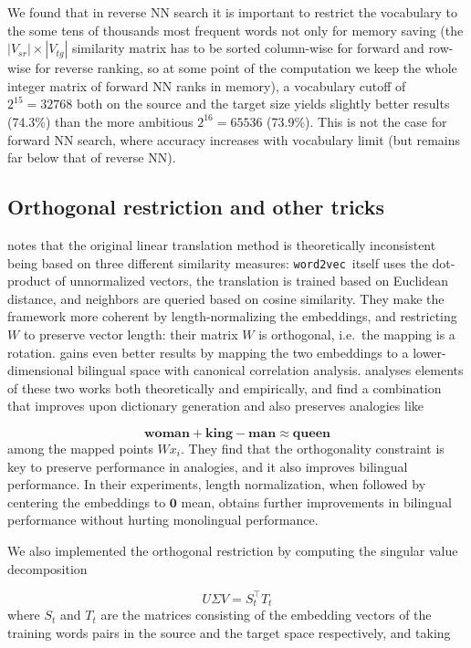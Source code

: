 \documentclass[11pt]{article}
\begin{document}
We found that in reverse NN search it is important to restrict the vocabulary to
the some tens of thousands most frequent words not only for memory saving (the
$|V_{sr}|\times|V_{tg}|$ similarity matrix has to be sorted column-wise for
forward and row-wise for reverse ranking, so at some point of the computation
we keep the whole integer matrix of forward NN ranks in memory), a vocabulary
cutoff of $2^{15}=32768$ both on the source and the target size yields slightly
better results (74.3\%) than the more ambitious $2^{16}=65536$ (73.9\%). This
is not the case for forward NN search, where accuracy increases with vocabulary
limit (but remains far below that of reverse NN).

\subsection{Orthogonal restriction and other tricks}

\newcommand{\wordtovec}{\texttt{word2vec}}

\cite{Xing:2015} notes that the original linear translation method is
theoretically inconsistent being based on three different similarity measures:
\wordtovec~itself uses the dot-product of unnormalized vectors, the translation
is trained based on Euclidean distance, and neighbors are queried based on
cosine similarity. They make the framework more coherent by length-normalizing
the embeddings, and restricting $W$ to preserve vector length: their matrix
$W$ is orthogonal, i.e.~the mapping is a rotation.  \citep{Faruqui:2014} gains
even better results by mapping the two embeddings to a lower-dimensional
bilingual space with canonical correlation analysis.  \citep{Artetxe:2016}
analyses elements of these two works both theoretically and empirically, and
find a combination that improves upon dictionary generation and also preserves
analogies \citep{Mikolov:2013l} like

\[\mathbf{woman} + \mathbf{king}- \mathbf{man}  \approx \mathbf{queen}\]
among the mapped points $Wx_i$. They find that the
orthogonality constraint is key to preserve performance in analogies, and it
also improves bilingual performance.  In their experiments, length
normalization, when followed by centering the embeddings to $\mathbf 0$ mean,
obtains further improvements in bilingual performance without hurting
monolingual performance.

We also implemented the orthogonal restriction by computing the singular value
decomposition

\[U\Sigma V=S_t^\top T_t\] where $S_t$ and $T_t$ are the matrices consisting of
the embedding vectors of
the training words pairs in the source and the target space respectively, and
taking
\end{document}
